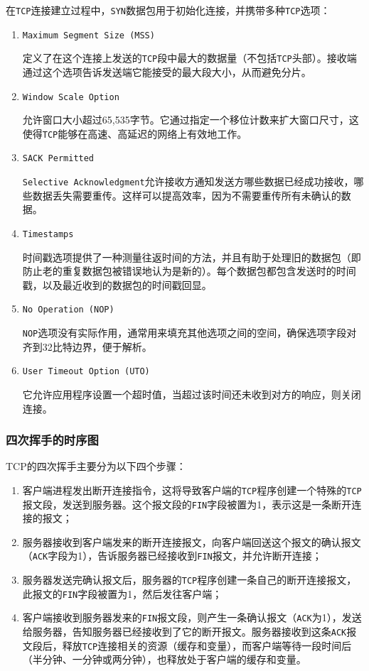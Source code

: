 \documentclass{article}
\begin{document}
在\texttt{TCP}连接建立过程中，\texttt{SYN}数据包用于初始化连接，并携带多种\texttt{TCP}选项：

\begin{enumerate}
	\item \texttt{Maximum Segment Size (MSS)}
	
	定义了在这个连接上发送的\texttt{TCP}段中最大的数据量（不包括\texttt{TCP}头部）。接收端通过这个选项告诉发送端它能接受的最大段大小，从而避免分片。
	
	\item \texttt{Window Scale Option}
	
	允许窗口大小超过65,535字节。它通过指定一个移位计数来扩大窗口尺寸，这使得\texttt{TCP}能够在高速、高延迟的网络上有效地工作。
	
	\item \texttt{SACK Permitted}
	
	\texttt{Selective Acknowledgment}允许接收方通知发送方哪些数据已经成功接收，哪些数据丢失需要重传。这样可以提高效率，因为不需要重传所有未确认的数据。
	
	\item \texttt{Timestamps}
	
	时间戳选项提供了一种测量往返时间的方法，并且有助于处理旧的数据包（即防止老的重复数据包被错误地认为是新的）。每个数据包都包含发送时的时间戳，以及最近收到的数据包的时间戳回显。
	
	\item \texttt{No Operation (NOP)}
	
	\texttt{NOP}选项没有实际作用，通常用来填充其他选项之间的空间，确保选项字段对齐到32比特边界，便于解析。
	
	\item \texttt{User Timeout Option (UTO)}
	
	它允许应用程序设置一个超时值，当超过该时间还未收到对方的响应，则关闭连接。
\end{enumerate}

\subsubsection{四次挥手的时序图}

TCP的四次挥手主要分为以下四个步骤：

\begin{enumerate}[noitemsep]
  \item 客户端进程发出断开连接指令，这将导致客户端的\texttt{TCP}程序创建一个特殊的\texttt{TCP}报文段，发送到服务器。这个报文段的\texttt{FIN}字段被置为1，表示这是一条断开连接的报文；
  \item 服务器接收到客户端发来的断开连接报文，向客户端回送这个报文的确认报文（\texttt{ACK}字段为1），告诉服务器已经接收到\texttt{FIN}报文，并允许断开连接；
  \item 服务器发送完确认报文后，服务器的\texttt{TCP}程序创建一条自己的断开连接报文，此报文的\texttt{FIN}字段被置为1，然后发往客户端；
  \item 客户端接收到服务器发来的\texttt{FIN}报文段，则产生一条确认报文（\texttt{ACK}为1），发送给服务器，告知服务器已经接收到了它的断开报文。服务器接收到这条\texttt{ACK}报文段后，释放\texttt{TCP}连接相关的资源（缓存和变量），而客户端等待一段时间后（半分钟、一分钟或两分钟），也释放处于客户端的缓存和变量。
\end{enumerate}
\end{document}
